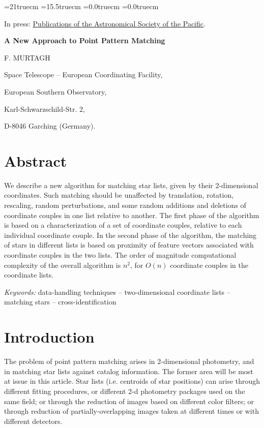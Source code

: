 \textheight=21truecm
\textwidth=15.5truecm
\oddsidemargin=0.0truecm
\evensidemargin=0.0truecm

In press: \underline{Publications of the Astronomical Society of the Pacific}.

\bigskip

\bigskip

\begin{center}

{\large{\bf A New Approach to Point Pattern Matching}}

\bigskip

F. MURTAGH

Space Telescope -- European Coordinating Facility,

European Southern Observatory,

Karl-Schwarzschild-Str. 2,

D-8046 Garching (Germany).

\end{center}

\section*{Abstract}

We describe a new algorithm for matching star lists, given by their 
2-dimensional coordinates.  Such matching should be unaffected by translation,
rotation, rescaling, random perturbations, and some random additions and 
deletions of
coordinate couples in one list relative to another.  The first phase of the
algorithm is based on a characterization of a set of coordinate couples,
relative to each individual coordinate couple.  In the second phase of the 
algorithm, the matching of stars in different lists is based on proximity
of feature vectors associated with coordinate couples in the two lists.
The order of magnitude computational complexity of the overall algorithm
is $n^2$, for $O(n)$ coordinate couples in the coordinate lists.

\medskip

{\it Keywords:} data-handling techniques -- two-dimensional coordinate lists 
-- matching stars -- cross-identification

\section{Introduction}

The problem of point pattern matching arises in 2-dimensional photometry,
and in matching star lists against catalog information.  The former area
will be most at issue in this article.  Star lists (i.e. centroids of
star positions) can arise through different fitting procedures, or 
different 2-d photometry packages used on the same field; or through 
the reduction of images based on different color filters; 
or through reduction of partially-overlapping images taken at different
times or with different detectors.


